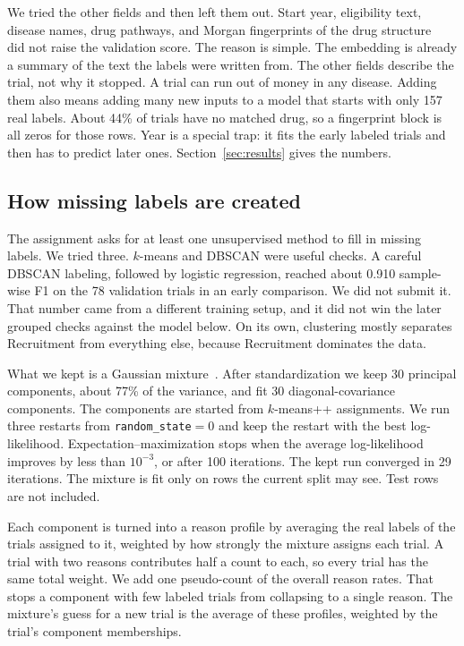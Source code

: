 We tried the other fields and then left them out. Start year, eligibility text,
disease names, drug pathways, and Morgan fingerprints of the drug
structure~\cite{rogers2010extended,rdkit,milacic2024reactome} did not raise the
validation score. The reason is simple. The embedding is already a summary of the
text the labels were written from. The other fields describe the trial, not why
it stopped. A trial can run out of money in any disease. Adding them also means
adding many new inputs to a model that starts with only 157 real labels. About
44\% of trials have no matched drug, so a fingerprint block is all zeros for
those rows. Year is a special trap: it fits the early labeled trials and then
has to predict later ones. Section~\ref{sec:results} gives the numbers.

\subsection{How missing labels are created}

The assignment asks for at least one unsupervised method to fill in missing
labels. We tried three. $k$-means and DBSCAN were useful checks. A careful
DBSCAN labeling, followed by logistic regression, reached about 0.910 sample-wise
F1 on the 78 validation trials in an early comparison. We did not submit it.
That number came from a different training setup, and it did not win the later
grouped checks against the model below. On its own, clustering mostly separates
Recruitment from everything else, because Recruitment dominates the data.

What we kept is a Gaussian mixture~\cite{dempster1977em,pedregosa2011scikit}.
After standardization we keep 30 principal components, about 77\% of the
variance, and fit 30 diagonal-covariance components. The components are started
from $k$-means++ assignments. We run three restarts from
\texttt{random\_state}${}=0$ and keep the restart with the best log-likelihood.
Expectation--maximization stops when the average log-likelihood improves by less
than $10^{-3}$, or after 100 iterations. The kept run converged in 29
iterations. The mixture is fit only on rows the current split may see. Test rows
are not included.

Each component is turned into a reason profile by averaging the real labels of
the trials assigned to it, weighted by how strongly the mixture assigns each
trial. A trial with two reasons contributes half a count to each, so every trial
has the same total weight. We add one pseudo-count of the overall reason rates.
That stops a component with few labeled trials from collapsing to a single
reason. The mixture's guess for a new trial is the average of these profiles,
weighted by the trial's component memberships.

